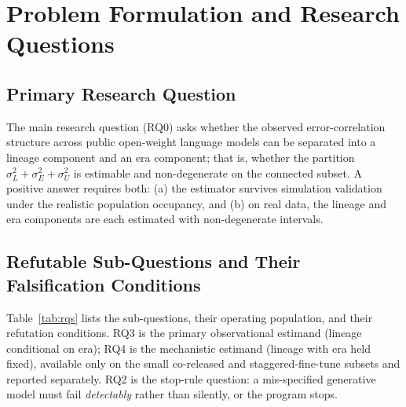 \documentclass{ieeeaccess}
\theoremstyle{definition}
\theoremstyle{plain}
\begin{document}
\section{Problem Formulation and Research Questions}
\label{sec:questions}

\subsection{Primary Research Question}
The main research question (RQ0) asks whether the observed error-correlation
structure across public open-weight language models can be separated into a lineage
component and an era component; that is, whether the partition
$\sigma^{2}_{L}+\sigma^{2}_{E}+\sigma^{2}_{U}$ is estimable and non-degenerate on
the connected subset. A positive answer requires both: (a) the estimator survives
simulation validation under the realistic population occupancy, and (b) on real
data, the lineage and era components are each estimated with non-degenerate
intervals.

\subsection{Refutable Sub-Questions and Their Falsification Conditions}
Table~\ref{tab:rqs} lists the sub-questions, their operating population, and their
refutation conditions. RQ3 is the primary observational estimand (lineage
conditional on era); RQ4 is the mechanistic estimand (lineage with era held fixed),
available only on the small co-released and staggered-fine-tune subsets and reported
separately. RQ2 is the stop-rule question: a mis-specified generative model must
fail \emph{detectably} rather than silently, or the program stops.
\end{document}
